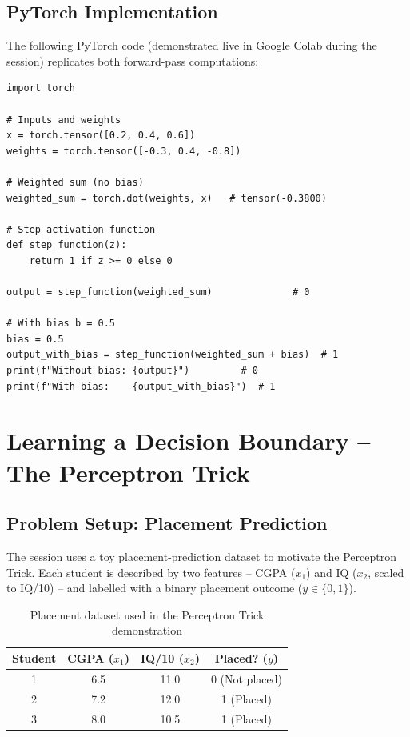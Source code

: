 \documentclass[12pt,a4paper]{article}
\begin{document}
\subsection{PyTorch Implementation}
\label{subsec:pytorch-impl}

The following PyTorch code (demonstrated live in Google Colab during
the session) replicates both forward-pass computations:

\begin{lstlisting}[style=python, caption={Perceptron forward pass in PyTorch (V13 -- 00:30:00)}, label={lst:forward-pass}]
import torch

# Inputs and weights
x = torch.tensor([0.2, 0.4, 0.6])
weights = torch.tensor([-0.3, 0.4, -0.8])

# Weighted sum (no bias)
weighted_sum = torch.dot(weights, x)   # tensor(-0.3800)

# Step activation function
def step_function(z):
    return 1 if z >= 0 else 0

output = step_function(weighted_sum)              # 0

# With bias b = 0.5
bias = 0.5
output_with_bias = step_function(weighted_sum + bias)  # 1
print(f"Without bias: {output}")         # 0
print(f"With bias:    {output_with_bias}")  # 1
\end{lstlisting}

\section{Learning a Decision Boundary -- The Perceptron Trick}
\label{sec:decision-boundary}

\subsection{Problem Setup: Placement Prediction}
\label{subsec:placement-problem}

The session uses a toy placement-prediction dataset to motivate the
Perceptron Trick.
Each student is described by two features -- CGPA ($x_1$) and IQ
($x_2$, scaled to IQ/10) -- and labelled with a binary placement
outcome ($y \in \{0, 1\}$).

\begin{table}[ht]
\centering
\caption{Placement dataset used in the Perceptron Trick demonstration}
\label{tab:placement}
\begin{tabular}{cccc}
\toprule
\textbf{Student} & \textbf{CGPA} ($x_1$) & \textbf{IQ/10} ($x_2$) & \textbf{Placed?} ($y$) \\
\midrule
1 & 6.5  & 11.0 & 0 (Not placed) \\
2 & 7.2  & 12.0 & 1 (Placed) \\
3 & 8.0  & 10.5 & 1 (Placed) \\
\bottomrule
\end{tabular}
\end{table}
\end{document}
